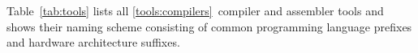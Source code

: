 \bigskip
\begin{small}
\begin{multicols}{2}
\amdaasm
\amdadism
\amdbasm
\amdbdism
\amdcasm
\amdcdism
\armaasm
\armadism
\armbasm
\armbdism
\armcasm
\armcdism
\asmprint
\avrasm
\avrdism
\avrttasm
\avrttdism
\cdamda
\cdamdb
\cdamdc
\cdarma
\cdarmb
\cdarmc
\cdarmcfpe
\cdavr
\cdavrtt
\cdcheck
\cdmabk
\cdmibl
\cdmipsa
\cdmipsb
\cdmmix
\cdopt
\cdorok
\cdppca
\cdppcb
\cdrisc
\cdrun
\cdwasm
\cdxtensa
\cppamda
\cppamdb
\cppamdc
\cpparma
\cpparmb
\cpparmc
\cpparmcfpe
\cppavr
\cppavrtt
\cppcheck
\cppcode
\cppdoc
\cppdump
\cpphtml
\cpplatex
\cppmabk
\cppmibl
\cppmipsa
\cppmipsb
\cppmmix
\cpporok
\cppppca
\cppppcb
\cppprep
\cppprint
\cpprisc
\cpprun
\cppwasm
\cppxtensa
\dbgdwarf
\doccheck
\dochtml
\doclatex
\docprint
\falamda
\falamdb
\falamdc
\falarma
\falarmb
\falarmc
\falarmcfpe
\falavr
\falavrtt
\falcheck
\falcode
\falcpp
\faldump
\falmabk
\falmibl
\falmipsa
\falmipsb
\falmmix
\falorok
\falppca
\falppcb
\falprint
\falrisc
\falrun
\falwasm
\falxtensa
\linkbin
\linkhex
\linklib
\linkmem
\linkprg
\mabkasm
\mabkdism
\mapsearch
\miblasm
\mibldism
\mipsaasm
\mipsadism
\mipsbasm
\mipsbdism
\mmixasm
\mmixdism
\obamda
\obamdb
\obamdc
\obarma
\obarmb
\obarmc
\obarmcfpe
\obavr
\obavrtt
\obcheck
\obcode
\obcpp
\obdoc
\obdump
\obhtml
\oblatex
\obmabk
\obmibl
\obmipsa
\obmipsb
\obmmix
\oborok
\obppca
\obppcb
\obprint
\obrisc
\obrun
\obwasm
\obxtensa
\orokasm
\orokdism
\ppcaasm
\ppcadism
\ppcbasm
\ppcbdism
\riscasm
\riscdism
\wasmasm
\wasmdism
\xtensaasm
\xtensadism
\label{tools:all}
\end{multicols}
\end{small}

Table~\ref{tab:tools} lists all \ref*{tools:compilers}~compiler and assembler tools and shows their naming scheme consisting of common programming language prefixes and hardware architecture suffixes.

\newcommand{\compilerref}[2]{\emph{\ref{#1:#2}}}
\newcommand{\compiler}[1]{\tool{#1}\refstepcounter{compiler}}
\newcommand{\languageref}[1]{\emph{Chapter~\ref{#1}}}
\newcommand{\architectureref}[1]{\multicolumn{2}{@{}l}{\emph{See Chapter~\ref{#1}}}}
\newcommand{\backends}[1]{\compiler{cpp#1} & \compiler{fal#1} & \compiler{ob#1}}
\newcommand{\backendrefs}[1]{\compilerref{cpp}{cpp#1} & \compilerref{false}{fal#1} & \compilerref{oberon}{ob#1}}
\newcommand{\compilers}[1]{\backends{#1} & \compiler{#1asm}}
\newcommand{\compilerrefs}[1]{\backendrefs{#1} & \compilerref{assembly}{#1asm}}

